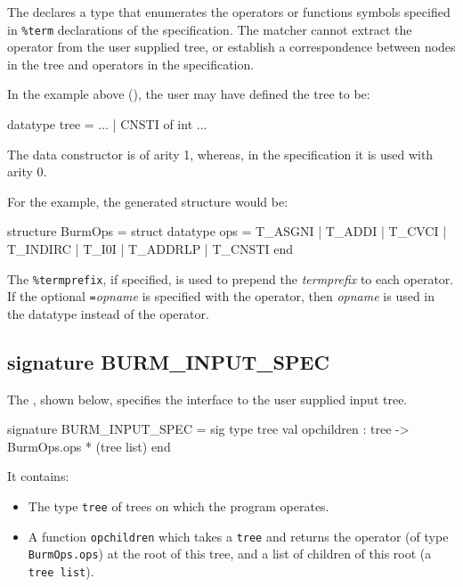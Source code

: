 The  declares a type  that enumerates
the operators or functions symbols specified in {\tt \%term}
declarations of the specification. The matcher cannot extract the
operator from the user supplied tree, or establish a correspondence
between nodes in the tree and operators in the specification.

In the example above (), the user may have
defined the tree to be:
\begin{code}
    datatype tree = ...
                  | CNSTI of int
                  ...
\end{code}
The data constructor  is of arity 1, whereas, in the
specification it is used with arity 0.

For the example, the generated structure would be:

\begin{code}
    structure BurmOps = struct
      datatype ops = 
           T_ASGNI 
         | T_ADDI   
         | T_CVCI 
         | T_INDIRC
         | T_I0I   
         | T_ADDRLP 
         | T_CNSTI
    end
\end{code}

The {\tt \%termprefix}, if specified, is used to prepend the {\sl
termprefix} to each operator. If the optional {\sl {\tt =}opname} is
specified with the operator, then {\sl opname} is used in the
datatype  instead of the operator.

	\subsection{signature BURM\_INPUT\_SPEC}

The , shown below, specifies the
interface to the user supplied input tree.
\begin{code}
    signature BURM_INPUT_SPEC = sig
      type tree
      val opchildren : tree -> BurmOps.ops * (tree list)
    end
\end{code}
It contains:
\begin{itemize}
 \item The type {\tt tree} of trees on which the program operates.

 \item A function {\tt opchildren} which takes a {\tt tree} and returns the
operator (of type {\tt BurmOps.ops}) at the root of this tree, and a list
of children of this root (a {\tt tree list}). 
\end{itemize}

